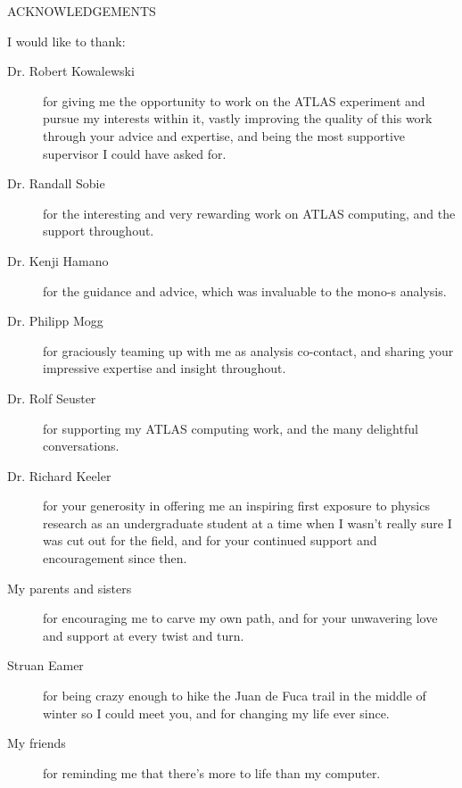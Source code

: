 \newpage


\begin{center}
ACKNOWLEDGEMENTS
\end{center}


\noindent 
I would like to thank:

\begin{description}
\item[Dr. Robert Kowalewski]
	for giving me the opportunity to work on the ATLAS experiment and pursue my interests within it, vastly improving the quality of this work through your advice and expertise, and being the most supportive supervisor I could have asked for. 
\item[Dr. Randall Sobie]
	for the interesting and very rewarding work on ATLAS computing, and the support throughout. 
\item[Dr. Kenji Hamano]
         for the guidance and advice, which was invaluable to the mono-s analysis.
\item[Dr. Philipp Mogg]
	for graciously teaming up with me as analysis co-contact, and sharing your impressive expertise and insight throughout. 
\item[Dr. Rolf Seuster]
	for supporting my ATLAS computing work, and the many delightful conversations. 
\item[Dr. Richard Keeler]
	for your generosity in offering me an inspiring first exposure to physics research as an undergraduate student at a time when I wasn't really sure I was cut out for the field, and for your continued support and encouragement since then. 
\item[My parents and sisters]
	for encouraging me to carve my own path, and for your unwavering love and support at every twist and turn. 
\item[Struan Eamer]
	for being crazy enough to hike the Juan de Fuca trail in the middle of winter so I could meet you, and for changing my life ever since. 
\item[My friends]
	for reminding me that there's more to life than my computer. 
\end{description}
